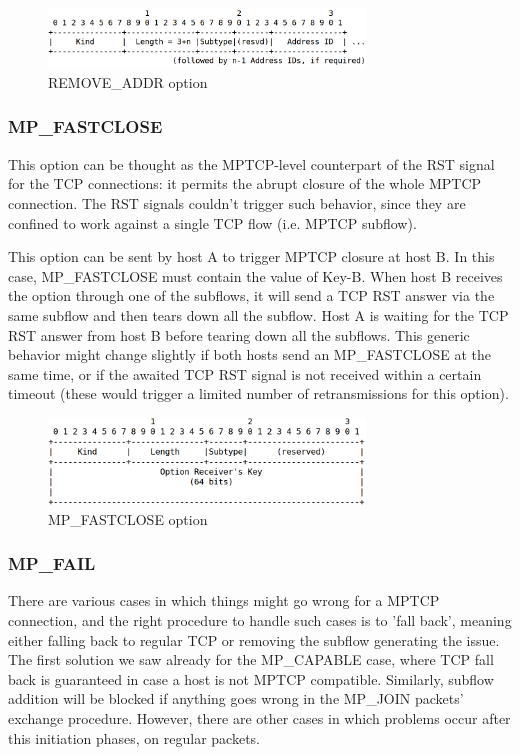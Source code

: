 \begin{figure}[!htb]
\centering
\includegraphics[width=0.75\textwidth]{images/opt_remove}
\caption{REMOVE\_ADDR option}
\label{fig:opt_remove}
\end{figure}



\subsubsection{MP\_FASTCLOSE}
This option can be thought as the MPTCP-level counterpart of the RST signal for the TCP connections: it permits the abrupt closure of the whole MPTCP connection. The RST signals couldn't trigger such behavior, since they are confined to work against a single TCP flow (i.e. MPTCP subflow).

This option can be sent by host A to trigger MPTCP closure at host B. In this case, MP\_FASTCLOSE must contain the value of Key-B. When host B receives the option through one of the subflows, it will send a TCP RST answer via the same subflow and then tears down all the subflow. Host A is waiting for the TCP RST answer from host B before tearing down all the subflows. This generic behavior might change slightly if both hosts send an MP\_FASTCLOSE at the same time, or if the awaited TCP RST signal is not received within a certain timeout (these would trigger a limited number of retransmissions for this option).

\begin{figure}[!htb]
\centering
\includegraphics[width=0.75\textwidth]{images/opt_fastclose}
\caption{MP\_FASTCLOSE option}
\label{fig:opt_fastclose}
\end{figure}

\subsubsection{MP\_FAIL}
There are various cases in which things might go wrong for a MPTCP connection, and the right procedure to handle such cases is to 'fall back', meaning either falling back to regular TCP or removing the subflow generating the issue. The first solution we saw already for the MP\_CAPABLE case, where TCP fall back is guaranteed in case a host is not MPTCP compatible. Similarly, subflow addition will be blocked if anything goes wrong in the MP\_JOIN packets' exchange procedure. However, there are other cases in which problems occur after this initiation phases, on regular packets.


